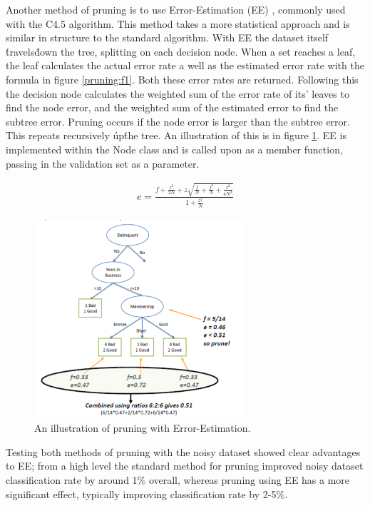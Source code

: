 \documentclass{article}
\begin{document}
Another method of pruning is to use Error-Estimation (EE) \cite{eeprune}, commonly used with the C4.5 algorithm. This method takes a more statistical approach and is similar in structure to the standard algorithm. With EE the dataset itself \'travels\' down the tree, splitting on each decision node. When a set reaches a leaf, the leaf calculates the actual error rate a well as the estimated error rate with the formula in figure \ref{pruning:f1}. Both these error rates are returned. Following this the decision node calculates the weighted sum of the error rate of its' leaves to find the node error, and the weighted sum of the estimated error to find the subtree error. Pruning occurs if the node error is larger than the subtree error. This repeats recursively \'up\' the tree. An illustration of this is in figure \ref{pruning:d1}. EE is implemented within the Node class and is called upon as a member function, passing in the validation set as a parameter.


\begin{align}
\label{pruning:f1}
	 e = \frac{ f + \frac{z^2}{2N} + z\sqrt{\frac{f}{N} + \frac{f^2}{N} + \frac{z^2}{4N^2}}  } {1 + \frac{z^2}{N}}
\end{align}

\begin{figure}
\centering
\includegraphics[width=0.7\textwidth]{figures/pruningd1.png}
\caption{\label{pruning:d1} An illustration of pruning with Error-Estimation. }
\end{figure}

Testing both methods of pruning with the noisy dataset showed clear advantages to EE; from a high level the standard method for pruning improved noisy dataset classification rate by around 1\% overall, whereas pruning using EE has a more significant effect, typically improving classification rate by 2-5\%.
\end{document}
